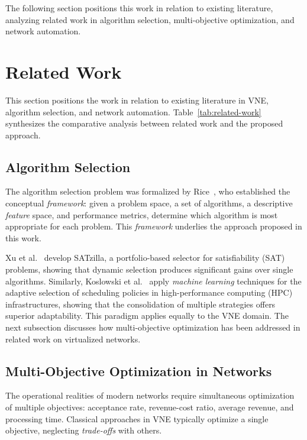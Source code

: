 \documentclass[runningheads]{llncs}
\begin{document}
The following section positions this work in relation to existing literature, analyzing related work in algorithm selection, multi-objective optimization, and network automation.

\section{Related Work}
\label{sec:RelatedWork}

This section positions the work in relation to existing literature in VNE, algorithm selection, and network automation.
Table~\ref{tab:related-work} synthesizes the comparative analysis between related work and the proposed approach.

\subsection{Algorithm Selection}
\label{subsec:alg-selection}

The algorithm selection problem was formalized by Rice~\cite{rice1976algorithm}, who established the conceptual \textit{framework}: given a problem space, a set of algorithms, a descriptive \textit{feature} space, and performance metrics, determine which algorithm is most appropriate for each problem. This \textit{framework} underlies the approach proposed in this work.

Xu et al.~\cite{xu2012satzilla} develop SATzilla, a portfolio-based selector for satisfiability (SAT) problems, showing that dynamic selection produces significant gains over single algorithms. Similarly, Koslowski et al.~\cite{koslowski2025knowledge-based} apply \textit{machine learning} techniques for the adaptive selection of scheduling policies in high-performance computing (HPC) infrastructures, showing that the consolidation of multiple strategies offers superior adaptability. This paradigm applies equally to the VNE domain. The next subsection discusses how multi-objective optimization has been addressed in related work on virtualized networks.

\subsection{Multi-Objective Optimization in Networks}
\label{subsec:multiobj-networks}

The operational realities of modern networks require simultaneous optimization of multiple objectives: acceptance rate, revenue-cost ratio, average revenue, and processing time. Classical approaches in VNE typically optimize a single objective, neglecting \textit{trade-offs} with others.
\end{document}
